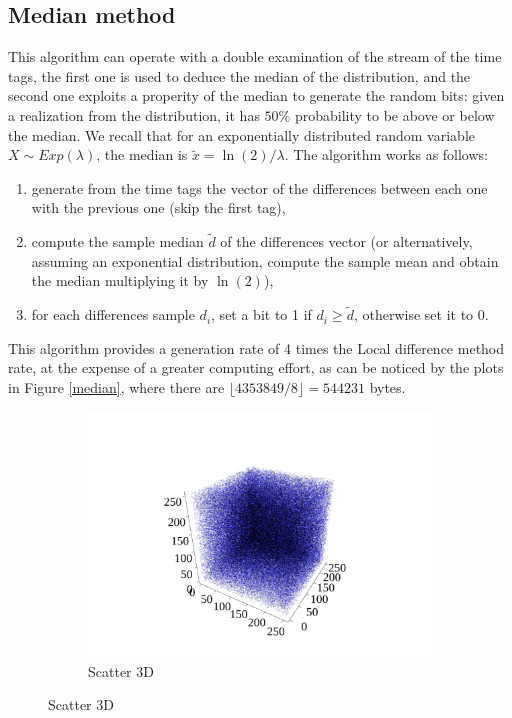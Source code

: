 \documentclass[10pt, final]{article}
\begin{document}
\begin{multicols}{2}
\subsection*{Median method}
This algorithm can operate with a double examination of the stream of the time tags, the first one is used to deduce the median of the distribution, and the second one exploits a properity of the median to generate the random bits: given a realization from the distribution, it has $50\%$ probability to be above or below the median. We recall that for an exponentially distributed random variable $X \sim Exp(\lambda)$, the median is $\tilde{x} = \ln(2)/\lambda$.
The algorithm works as follows:
\begin{enumerate}
    \item generate from the time tags the vector of the differences between each one with the previous one (skip the first tag),
    \item compute the sample median $\widetilde{d}$ of the differences vector (or alternatively, assuming an exponential distribution, compute the sample mean and obtain the median multiplying it by $\ln(2)$),
    \item for each differences sample $d_i$, set a bit to 1 if $d_i \geq \widetilde{d}$, otherwise set it to 0.
\end{enumerate}
This algorithm provides a generation rate of 4 times the Local difference method rate, at the expense of a greater computing effort, as can be noticed by the plots in Figure \ref{median}, where there are $\lfloor 4353849/8\rfloor = 544231$ bytes.
\begin{mdframed}
    \begin{figure}[H]
        \begin{subfigure}{\textwidth}
            \centering
            \includegraphics[width = \textwidth]{../random_img/naif-scatter3d.pdf}
            \caption{Scatter 3D}
        \end{subfigure}


\end{figure}
\end{mdframed}
\end{multicols}
\end{document}
